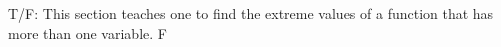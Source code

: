 {T/F: This section teaches one to find the extreme values of a function that has more than one variable.
}
{F
}

